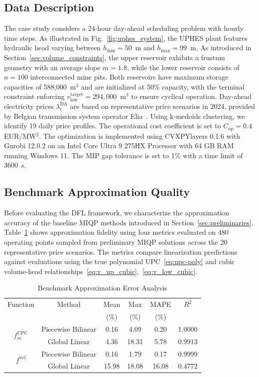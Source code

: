 \documentclass[journal]{IEEEtran}
\begin{document}
\subsection{Data Description}
\label{sec:data}

The case study considers a 24-hour day-ahead scheduling problem with hourly time steps. As illustrated in Fig.~\ref{fig:uphes_system}, the UPHES plant features hydraulic head varying between $h_{\min} = 50$~m and $h_{\max} = 99$~m. As introduced in Section~\ref{sec:volume_constraints}, the upper reservoir exhibits a frustum geometry with an average slope $m=1.8$, while the lower reservoir consists of $n=100$ interconnected mine pits. Both reservoirs have maximum storage capacities of 588,000~m$^3$ and are initialized at 50\% capacity, with the terminal constraint enforcing $v_{\text{low}}^{\text{target}} = 294,000$~m$^3$ to ensure cyclical operation.
Day-ahead electricity prices $\lambda_t^{\text{DA}}$ are based on representative price scenarios in 2024, provided by Belgian transmission system operator Elia~\cite{EliaDayAheadReferencePrice}. Using k-medoids clustering, we identify 19 daily price profiles. The operational cost coefficient is set to $C_{\text{op}} = 0.4$ EUR/MW$^2$. The optimization is implemented using CVXPYlayers 0.1.6 with Gurobi 12.0.2 on an Intel Core Ultra 9 275HX Processor with 64 GB RAM running Windows 11. The MIP gap tolerance is set to 1\% with a time limit of 3600~s.

\subsection{Benchmark Approximation Quality}

Before evaluating the DFL framework, we characterize the approximation accuracy of the baseline MIQP methods introduced in Section~\ref{sec:preliminaries}. Table~\ref{tab:linearization_errors} shows approximation fidelity using four metrics evaluated on 480 operating points sampled from preliminary MIQP solutions across the 20 representative price scenarios. The metrics compare linearization predictions against evaluations using the true polynomial UPC~\eqref{eq:upc-poly} and cubic volume-head relationships~\eqref{eq:v_up_cubic},~\eqref{eq:v_low_cubic}.

\begin{table}[t!]
\centering
\caption{Benchmark Approximation Error Analysis}
\label{tab:linearization_errors}
\small
\begin{tabular}{@{}cccccc@{}}
\toprule
Function & Method & Mean & Max & MAPE & $R^2$ \\
 & & (\%) & (\%) & (\%) & \\
\midrule
\multirow{2}{*}{$f_m^{\text{UPC}}$} 
 & Piecewise Bilinear & 0.16 & 4.09 & 0.20 & 1.0000 \\
 & Global Linear & 4.36 & 18.31 & 5.78 & 0.9913 \\
\midrule
\multirow{2}{*}{$f^{\text{vol}}$} 
 & Piecewise Bilinear & 0.16 & 1.79 & 0.17 & 0.9999 \\
 & Global Linear & 15.98 & 18.08 & 16.08 & 0.4772 \\
\bottomrule
\end{tabular}
\end{table}
\end{document}
